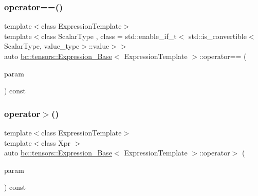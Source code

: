 \subsubsection{\texorpdfstring{operator==()}{operator==()}\hspace{0.1cm}{\footnotesize\ttfamily [2/2]}}
{\footnotesize\ttfamily template$<$class Expression\+Template$>$ \\
template$<$class Scalar\+Type , class  = std\+::enable\+\_\+if\+\_\+t$<$   std\+::is\+\_\+convertible$<$\+Scalar\+Type, value\+\_\+type$>$\+::value$>$$>$ \\
auto \hyperlink{classbc_1_1tensors_1_1Expression__Base}{bc\+::tensors\+::\+Expression\+\_\+\+Base}$<$ Expression\+Template $>$\+::operator== (\begin{DoxyParamCaption}\item[{const Scalar\+Type \&}]{param }\end{DoxyParamCaption}) const\hspace{0.3cm}{\ttfamily [inline]}}

\mbox{\label{classbc_1_1tensors_1_1Expression__Base_a0c12d27fd662e84850eb583d132c5b61}} 
\subsubsection{\texorpdfstring{operator$>$()}{operator>()}\hspace{0.1cm}{\footnotesize\ttfamily [1/2]}}
{\footnotesize\ttfamily template$<$class Expression\+Template$>$ \\
template$<$class Xpr $>$ \\
auto \hyperlink{classbc_1_1tensors_1_1Expression__Base}{bc\+::tensors\+::\+Expression\+\_\+\+Base}$<$ Expression\+Template $>$\+::operator$>$ (\begin{DoxyParamCaption}\item[{const \hyperlink{classbc_1_1tensors_1_1Expression__Base}{Expression\+\_\+\+Base}$<$ Xpr $>$ \&}]{param }\end{DoxyParamCaption}) const\hspace{0.3cm}{\ttfamily [inline]}}

\mbox{\label{classbc_1_1tensors_1_1Expression__Base_ad4464ed8be86c2097b8aea7381a7ee51}} 
